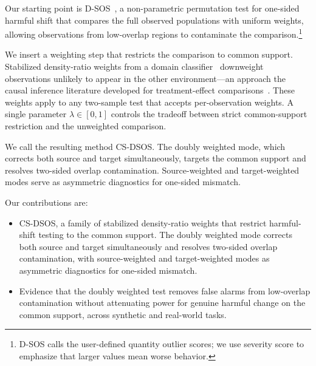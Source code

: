 Our starting point is D-SOS~\cite{pmlr-v180-kamulete22a}, a non-parametric
permutation test for one-sided harmful shift that compares the full observed
populations with uniform weights, allowing observations from low-overlap
regions to contaminate the comparison.\footnote{D-SOS calls the user-defined
quantity outlier scores; we use severity score to emphasize that larger
values mean worse behavior.}

We insert a weighting step that restricts the comparison to common support.
Stabilized density-ratio weights from a domain
classifier~\cite{Bickel_2007,Yamada_2013} downweight observations unlikely
to appear in the other environment---an approach the causal inference
literature developed for treatment-effect comparisons~\cite{Crump_2009,
Morgan_2015}. These weights apply to any two-sample test that accepts
per-observation weights. A single parameter $\lambda \in [0, 1]$ controls
the tradeoff between strict common-support restriction and the unweighted
comparison.

We call the resulting method CS-DSOS. The doubly weighted mode, which corrects
both source and target simultaneously, targets the common support and resolves
two-sided overlap contamination. Source-weighted and target-weighted modes serve
as asymmetric diagnostics for one-sided mismatch.

Our contributions are:
\begin{itemize}
\item CS-DSOS, a family of stabilized density-ratio weights that restrict
  harmful-shift testing to the common support. The doubly weighted mode
  corrects both source and target simultaneously and resolves two-sided
  overlap contamination, with source-weighted and target-weighted modes as
  asymmetric diagnostics for one-sided mismatch.
\item Evidence that the doubly weighted test removes false alarms from
  low-overlap contamination without attenuating power for genuine harmful
  change on the common support, across synthetic and real-world tasks.
\end{itemize}
